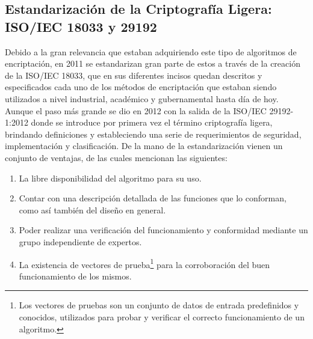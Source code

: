 \documentclass[a4paper,10pt]{article}
\begin{document}
	\subsection{Estandarización de la Criptografía Ligera: ISO/IEC 18033 y 29192}
	Debido a la gran relevancia que estaban adquiriendo este tipo de algoritmos de encriptación, en 2011 se estandarizan gran parte de estos a través de la creación de la ISO/IEC 18033, que en sus diferentes incisos quedan descritos y especificados cada uno de los métodos de encriptación que estaban siendo utilizados a nivel industrial, académico y gubernamental hasta día de hoy. Aunque el paso más grande se dio en 2012 con la salida de la ISO/IEC 29192-1:2012 donde se introduce por primera vez el término criptografía ligera, brindando definiciones y estableciendo una serie de requerimientos de seguridad, implementación y clasificación. De la mano de la estandarización vienen un conjunto de ventajas, de las cuales \textcite{eterovic15stream} mencionan las siguientes:
	\begin{enumerate}
		\item La libre disponibilidad del algoritmo para su uso. 
		\item Contar con una descripción detallada de las funciones que lo conforman, como así también del diseño en general. 
		\item Poder realizar una verificación del funcionamiento y conformidad mediante un grupo independiente de expertos. 
		\item La existencia de vectores de prueba\footnote{Los vectores de pruebas son un conjunto de datos de entrada predefinidos y conocidos, utilizados para probar y verificar el correcto funcionamiento de un algoritmo.} para la corroboración del buen funcionamiento de los mismos.
	\end{enumerate}
\end{document}
